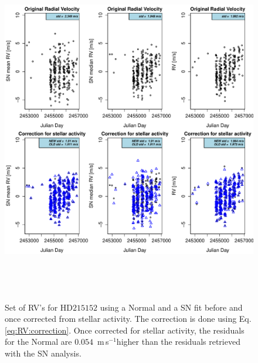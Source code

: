 \documentclass[11pt, oneside]{article}
\def\ms{\hbox{\,m\,s$^{-1}$}}         %
\begin{document}
\begin{figure} 
   \centering
\includegraphics[height = 6in]{NEW_CORRECTIONHD21515_[3]CorrectionActivity_RadialVelocity_vs_time.pdf} 
   \caption{Set of RV's for $\text{HD}215152$ using a Normal and a SN fit before and once corrected from stellar activity. The correction is done using Eq. \ref{eq:RV:correction}. Once corrected for stellar activity, the residuals for the Normal are $0.054$ \ms higher than the residuals retrieved with the SN analysis.}
   \label{fig:HD215152:correctionRV}
\end{figure}
\end{document}
